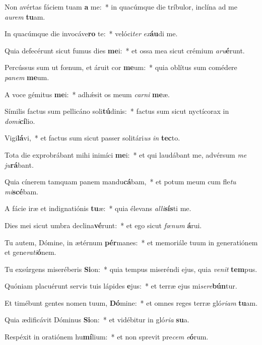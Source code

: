 \item Non avértas fáciem tuam \textbf{a} me:~* in quacúmque die tríbulor, inclína ad me \textit{au}\textit{rem} \textbf{tu}am.
\item In quacúmque die invocáve\textbf{ro} te:~* velóci\textit{ter} \textit{ex}\textbf{áu}di me.
\item Quia defecérunt sicut fumus dies \textbf{me}i:~* et ossa mea sicut crémium \textit{a}\textit{ru}\textbf{é}runt.
\item Percússus sum ut fœnum, et áruit cor \textbf{me}um:~* quia oblítus sum comédere \textit{pa}\textit{nem} \textbf{me}um.
\item A voce gémitus \textbf{me}i:~* adhǽsit os meum \textit{car}\textit{ni} \textbf{me}æ.
\item Símilis factus sum pellicáno soli\textbf{tú}dinis:~* factus sum sicut nyctícorax in \textit{do}\textit{mi}\textbf{cí}lio.
\item Vigi\textbf{lá}vi,~* et factus sum sicut passer solitári\textit{us} \textit{in} \textbf{tec}to.
\item Tota die exprobrábant mihi inimíci \textbf{me}i:~* et qui laudábant me, advérsum \textit{me} \textit{ju}\textbf{rá}bant.
\item Quia cínerem tamquam panem mandu\textbf{cá}bam,~* et potum meum cum fle\textit{tu} \textit{mi}\textbf{scé}bam.
\item A fácie iræ et indignatiónis \textbf{tu}æ:~* quia élevans \textit{al}\textit{li}\textbf{sís}ti me.
\item Dies mei sicut umbra declina\textbf{vé}runt:~* et ego sicut \textit{fœ}\textit{num} \textbf{á}rui.
\item Tu autem, Dómine, in ætérnum \textbf{pér}manes:~* et memoriále tuum in generatiónem et gene\textit{ra}\textit{ti}\textbf{ó}nem.
\item Tu exsúrgens miseréberis \textbf{Si}on:~* quia tempus miseréndi ejus, quia \textit{ve}\textit{nit} \textbf{tem}pus.
\item Quóniam placuérunt servis tuis lápides \textbf{e}jus:~* et terræ ejus mi\textit{se}\textit{re}\textbf{bún}tur.
\item Et timébunt gentes nomen tuum, \textbf{Dó}mine:~* et omnes reges terræ gló\textit{ri}\textit{am} \textbf{tu}am.
\item Quia ædificávit Dóminus \textbf{Si}on:~* et vidébitur in gló\textit{ri}\textit{a} \textbf{su}a.
\item Respéxit in oratiónem hu\textbf{mí}lium:~* et non sprevit pre\textit{cem} \textit{e}\textbf{ó}rum.
